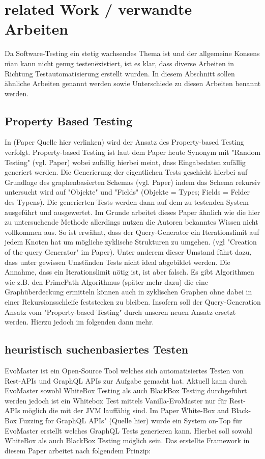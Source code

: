 \chapter{related Work / verwandte Arbeiten}

Da Software-Testing ein stetig wachsendes Thema ist und der allgemeine Konsens \"man kann nicht genug testen\" existiert, ist
es klar, dass diverse Arbeiten in Richtung Testautomatisierung erstellt wurden. In diesem Abschnitt sollen ähnliche Arbeiten
genannt werden sowie Unterschiede zu diesen Arbeiten benannt werden.

\section{Property Based Testing}

In (Paper Quelle hier verlinken) wird der Ansatz des Property-based Testing verfolgt.
Property-based Testing ist laut dem Paper heute Synonym mit "Random Testing" (vgl. Paper) wobei zufällig hierbei meint,
dass Eingabedaten zufällig generiert werden.
Die Generierung der eigentlichen Tests geschieht hierbei auf Grundlage des graphenbasierten Schemas (vgl. Paper) indem
das Schema rekursiv untersucht wird auf "Objekte" und "Fields" (Objekte = Types; Fields = Felder des Typens).
Die generierten Tests werden dann auf dem zu testenden System ausgeführt und ausgewertet.
Im Grunde arbeitet dieses Paper ähnlich wie die hier zu untersuchende Methode allerdings nutzen die
Autoren bekanntes Wissen nicht vollkommen aus.
So ist erwähnt, dass der Query-Generator ein Iterationslimit auf jedem Knoten hat um mögliche zyklische Strukturen
zu umgehen. (vgl "Creation of the query Generator" im Paper).
Unter anderem dieser Umstand führt dazu, dass unter gewissen Umständen Tests nicht ideal abgebildet werden.
Die Annahme, dass ein Iterationslimit nötig ist, ist aber falsch.
Es gibt Algorithmen wie z.B. den PrimePath Algorithmus (später mehr dazu) die eine Graphüberdeckung ermitteln können
auch in zyklischen Graphen ohne dabei in einer Rekursionsschleife feststecken zu bleiben.
Insofern soll der Query-Generation Ansatz vom "Property-based Testing" durch unseren neuen Ansatz ersetzt werden.
Hierzu jedoch im folgenden dann mehr.

\section{heuristisch suchenbasiertes Testen}

EvoMaster ist ein Open-Source Tool welches sich automatisiertes Testen von Rest-APIs und GraphQL APIs zur Aufgabe gemacht hat.
Aktuell kann durch EvoMaster sowohl WhiteBox Testing als auch BlackBox Testing durchgeführt werden jedoch ist ein
Whitebox Test mittels Vanilla-EvoMaster nur für Rest-APIs möglich die mit der JVM lauffähig sind.
Im Paper \"White-Box and Black-Box Fuzzing for GraphQL APIs" (Quelle hier) wurde ein System on-Top für EvoMaster
erstellt welches GraphQL Tests generieren kann. Hierbei soll sowohl WhiteBox als auch BlackBox Testing möglich sein.
Das erstellte Framework in diesem Paper arbeitet nach folgendem Prinzip:


